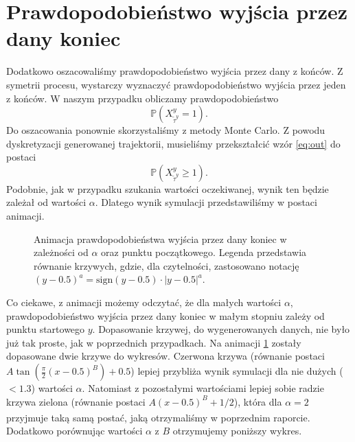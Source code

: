 \documentclass[12pt]{mwrep}
\begin{document}
	
	\section{Prawdopodobieństwo wyjścia przez dany koniec}
	\noindent Dodatkowo oszacowaliśmy prawdopodobieństwo wyjścia przez dany z końców. Z symetrii procesu, wystarczy wyznaczyć prawdopodobieństwo wyjścia przez jeden z końców. W naszym przypadku obliczamy prawdopodobieństwo
	\begin{equation}\label{eq:out}
		\mathbb{P}\left(X^y_{\widetilde\tau^y}=1\right).
	\end{equation}
	Do oszacowania ponownie skorzystaliśmy z metody Monte Carlo. Z powodu dyskretyzacji generowanej trajektorii, musieliśmy przekształcić wzór \eqref{eq:out} do postaci
	\begin{equation}
		\mathbb{P}\left(X^y_{\widetilde\tau^y}\geq1\right).
	\end{equation}
	Podobnie, jak w przypadku szukania wartości oczekiwanej, wynik ten będzie zależał od wartości $\alpha$. Dlatego wynik symulacji przedstawiliśmy w postaci animacji.
	\begin{figure}[H]
		\caption{Animacja prawdopodobieństwa wyjścia przez dany koniec w zależności od $\alpha$ oraz punktu początkowego. Legenda przedstawia równanie krzywych, gdzie, dla czytelności, zastosowano notację $(y-0.5)^a=\text{sign}(y-0.5)\cdot|y-0.5|^a$.}\label{anim:out}
	\end{figure}
	\noindent Co ciekawe, z animacji możemy odczytać, że dla małych wartości $\alpha$, prawdopodobieństwo wyjścia przez dany koniec w małym stopniu zależy od punktu startowego $y$. Dopasowanie krzywej, do wygenerowanych danych, nie było już tak proste, jak w poprzednich przypadkach. Na animacji \ref{anim:out} zostały dopasowane dwie krzywe do wykresów. Czerwona krzywa (równanie postaci $A\tan\left(\frac{\pi}{2}\left(x-0.5\right)^B\right)+0.5$) lepiej przybliża wynik symulacji dla nie dużych ($<1.3$) wartości $\alpha$. Natomiast z pozostałymi wartościami lepiej sobie radzie krzywa zielona (równanie postaci $A\left(x-0.5\right)^B+1/2$), która dla $\alpha=2$ przyjmuje taką samą postać, jaką otrzymaliśmy w poprzednim raporcie\textsuperscript{\cite{rap}}. Dodatkowo porównując wartości $\alpha$ z $B$ otrzymujemy poniższy wykres.
\end{document}
